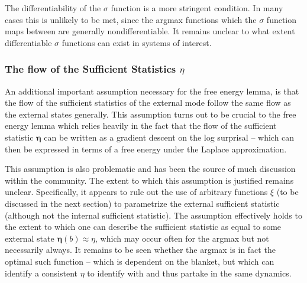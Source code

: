 The differentiability of the $\sigma$ function is a more stringent condition. In many cases this is unlikely to be met, since the argmax functions which the $\sigma$ function maps between are generally nondifferentiable. It remains unclear to what extent differentiable $\sigma$ functions can exist in systems of interest.
\subsubsection{The flow of the Sufficient Statistics $\eta$}

An additional important assumption necessary for the free energy lemma, is that the flow of the sufficient statistics of the external mode follow the same flow as the external states generally. This assumption turns out to be crucial to the free energy lemma which relies heavily in the fact that the flow of the sufficient statistic $\bm{\eta}$ can be written as a gradient descent on the log surprisal -- which can then be expressed in terms of a free energy under the Laplace approximation.

This assumption is also problematic and has been the source of much discussion within the community. The extent to which this assumption is justified remains unclear. Specifically, it appears to rule out the use of arbitrary functions $\xi$ (to be discussed in the next section) to parametrize the external sufficient statistic (although not the internal sufficient statistic). The assumption effectively holds to the extent to which one can describe the sufficient statistic as equal to some external state $\bm{\eta}(b) \approx \eta$, which may occur often for the argmax but not necessarily always. It remains to be seen whether the argmax is in fact the optimal such function -- which is dependent on the blanket, but which can identify a consistent $\eta$ to identify with and thus partake in the same dynamics.


